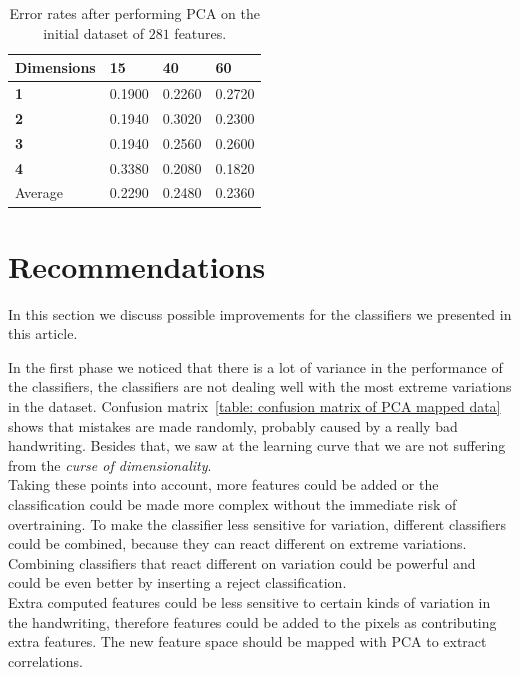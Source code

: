 \documentclass{article}
\begin{document}
\begin{table}[H]
    \centering
    \begin{tabular}{l|lll|}
    \hline
    Dimensions & \textbf{15}     & \textbf{40}     & \textbf{60}     \\ \hline
    \textbf{1}          & 0.1900 & 0.2260 & 0.2720 \\ 
    \textbf{2}          & 0.1940 & 0.3020 & 0.2300 \\
    \textbf{3}          & 0.1940 & 0.2560 & 0.2600 \\
    \textbf{4}          & 0.3380 & 0.2080 & 0.1820 \\ \hline
    Average   & 0.2290 & 0.2480 & 0.2360 \\ \hline
    \end{tabular}
    \caption{Error rates after performing PCA on the initial dataset of $281$ features. \label{table:scenario2-pca}}
\end{table}

\section{Recommendations}

In this section we discuss possible improvements for the classifiers we presented in this article. 

In the first phase we noticed that there is a lot of variance in the performance of the classifiers, the classifiers are not dealing well with the most extreme variations in the dataset. Confusion matrix~\ref{table: confusion matrix of PCA mapped data} shows that mistakes are made randomly, probably caused by a really bad handwriting. Besides that, we saw at the learning curve that we are not suffering from the \emph{curse of dimensionality}. \\

Taking these points into account, more features could be added or the classification could be made more complex without the immediate risk of overtraining. To make the classifier less sensitive for variation, different classifiers could be combined, because they can react different on extreme variations. Combining classifiers that react different on variation could be powerful and could be even better by inserting a reject classification. \\

Extra computed features could be less sensitive to certain kinds of variation in the handwriting, therefore features could be added to the pixels as contributing extra features. The new feature space should be mapped with PCA to extract correlations.\\
\end{document}
